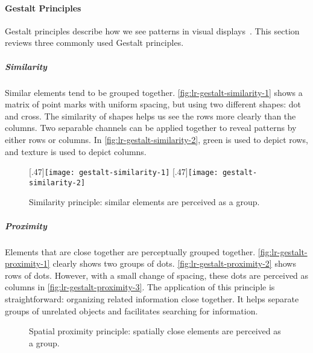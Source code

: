 \paragraph{Gestalt Principles}
\label{sub:lr-gestalt}
Gestalt principles describe how we see patterns in visual displays~\cite{Koffka1935}. This section reviews three commonly used Gestalt principles.

\subparagraph{Similarity} 
Similar elements tend to be grouped together. \autoref{fig:lr-gestalt-similarity-1} shows a matrix of point marks with uniform spacing, but using two different shapes: dot and cross. The similarity of shapes helps us see the rows more clearly than the columns. Two separable channels can be applied together to reveal patterns by either rows or columns. In \autoref{fig:lr-gestalt-similarity-2}, green is used to depict rows, and texture is used to depict columns.

\begin{figure}[!htb]
	\centering
	[.47\columnwidth]{\texttt{[image: gestalt-similarity-1]}} 
	\hfill
	[.47\columnwidth]{\texttt{[image: gestalt-similarity-2]}} \label{fig:lr-gestalt-similarity}
	\caption{Similarity principle: similar elements are perceived as a group. }
\end{figure}

\subparagraph{Proximity} 
Elements that are close together are perceptually grouped together. \autoref{fig:lr-gestalt-proximity-1} clearly shows two groups of dots. \autoref{fig:lr-gestalt-proximity-2} shows rows of dots. However, with a small change of spacing, these dots are perceived as columns in \autoref{fig:lr-gestalt-proximity-3}. The application of this principle is straightforward: organizing related information close together. It helps separate groups of unrelated objects and facilitates searching for information.

\begin{figure}[!htb]
	\centering
	\hfill
	\hfill
	\label{fig:lr-gestalt-proximity}
	\caption{Spatial proximity principle: spatially close elements are perceived as a group. }
\end{figure}


